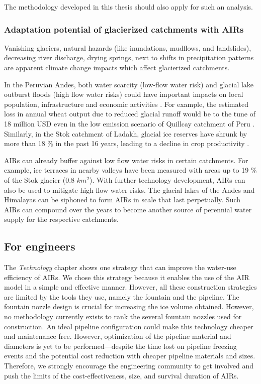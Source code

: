 The methodology developed in this thesis should also apply for such an analysis.

\subsubsection{Adaptation potential of glacierized catchments with AIRs}

Vanishing glaciers, natural hazards (like inundations, mudflows, and landslides), decreasing river discharge,
drying springs, next to shifts in precipitation patterns are apparent climate change impacts which affect
glacierized catchments.

In the Peruvian Andes, both water scarcity (low-flow water risk) and glacial lake outburst floods (high flow
water risks) could have important impacts on local population, infrastructure and economic activities
\citep{motschmannIntegratedAssessmentsWater2020}. For example, the estimated loss in annual wheat output due to
reduced glacial runoff would be to the tune of 18 million USD even in the low emission scenario of Quillcay catchment
of Peru \citep{motschmannLossesDamagesConnected2020}. Similarly, in the Stok catchment of Ladakh, glacial ice
reserves have shrunk by more than 18 \% in the past 16 years, leading to a decline in crop productivity
\citep{sohebSpatiotemporalQuantificationKey2022}.

AIRs can already buffer against low flow water risks in certain catchments. For example, ice
terraces in nearby valleys have been measured with areas up to 19 \% of the Stok glacier (0.8 $km^2$). With further technology
development, AIRs can also be used to mitigate high flow water risks. The glacial lakes of the Andes and
Himalayas can be siphoned to form AIRs in scale that last perpetually. Such AIRs can compound over the years to
become another source of perennial water supply for the respective catchments.

\subsection{For engineers}

The \textit{Technology} chapter shows one strategy that can improve the water-use efficiency of AIRs. We chose
this strategy because it enables the use of the AIR model in a simple and effective manner. However, all these
construction strategies are limited by the tools they use, namely the fountain and the pipeline. The fountain
nozzle design is crucial for increasing the ice volume obtained. However, no methodology currently exists to
rank the several fountain nozzles used for construction. An ideal pipeline configuration could make this
technology cheaper and maintenance free. However, optimization of the pipeline material and diameters is yet to
be performed---despite the time lost on pipeline freezing events and the potential cost reduction with cheaper
pipeline materials and sizes. Therefore, we strongly encourage the engineering community to get involved and
push the limits of the cost-effectiveness, size, and survival duration of \ac{AIRs}.

